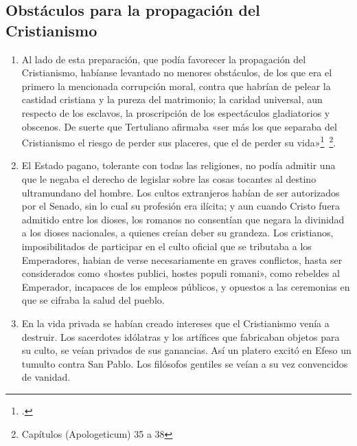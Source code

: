 \raggedbottom{} \documentclass[12pt, a4paper, openany]{book} %
\begin{document}
\subsection{Obstáculos para la propagación del Cristianismo}
\begin{enumerate}
  \item Al lado de esta preparación, que podía favorecer la propagación del Cristianismo, habíanse levantado no menores obstáculos, de los que era el primero la mencionada corrupción moral, contra que habrían de pelear la castidad cristiana y la pureza del matrimonio; la caridad universal, aun respecto de los esclavos, la proscripción de los espectáculos gladiatorios y obscenos. De suerte que Tertuliano afirmaba «ser más los que separaba del Cristianismo el riesgo de perder sus placeres, que el de perder su vida»\footcites{Tertuliano202Spectaculis}{Tertuliano197Apologeticum}{Origenes248ContraCelsum}~\footnote{Capítulos (Apologeticum) 35 a 38}.
  \item El Estado pagano, tolerante con todas las religiones, no podía admitir una que le negaba el derecho de legislar sobre las cosas tocantes al destino ultramundano del hombre. Los cultos extranjeros habían de ser autorizados por el Senado, sin lo cual su profesión era ilícita; y aun cuando Cristo fuera admitido entre los dioses, los romanos no consentían que negara la divinidad a los dioses nacionales, a quienes creían deber su grandeza. Los cristianos, imposibilitados de participar en el culto oficial que se tributaba a los Emperadores, habian de verse necesariamente en graves conflictos, hasta ser considerados como «hostes publici, hostes populi romani», como rebeldes al Emperador, incapaces de los empleos públicos, y opuestos a las ceremonias en que se cifraba la salud del pueblo.
  \item En la vida privada se habían creado intereses que el Cristianismo venía a destruir. Los sacerdotes idólatras y los artífices que fabricaban objetos para su culto, se veían privados de sus ganancias. Así un platero excitó en Efeso un tumulto contra San Pablo. Los filósofos gentiles se veían a su vez convencidos de vanidad.

\end{enumerate}
\end{document}
